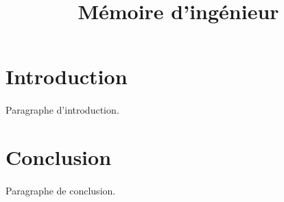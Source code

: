 \documentclass[a4paper, 12pt]{article}
\title{Mémoire d'ingénieur}
\newcommand{\comment}[1]{}
\begin{document}
	
	\maketitle
	  
	\section*{Introduction}
		\paragraph{}
		Paragraphe d'introduction.
	
	\comment{
	Corps du mémoire
	}
	
	
	
	
	\section*{Conclusion}
		\paragraph{}
		Paragraphe de conclusion.
\end{document}
